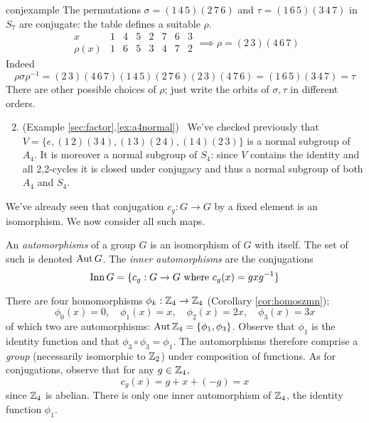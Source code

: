 \goodbreak

\begin{examples}{}{conjexample}
	\exstart The permutations $\sigma=(1\,4\,5)(2\,7\,6)$ and $\tau=(1\,6\,5)(3\,4\,7)$ in $S_7$ are conjugate: the table defines a suitable $\rho$.
	\[
		\begin{array}{l|ccccccc}
      x&1&4&5&2&7&6&3\\\hline
      \rho(x)&1&6&5&3&4&7&2
    \end{array}
    \implies \rho=(2\,3)(4\,6\,7)
   \]
	Indeed
	\[
		\rho\sigma\rho^{-1}
		=(2\,3)(4\,6\,7)(1\,4\,5)(2\,7\,6)(2\,3)(4\,7\,6)
		=(1\,6\,5)(3\,4\,7) =\tau
	\]
	There are other possible choices of $\rho$; just write the orbits of $\sigma,\tau$ in different orders.
	\begin{enumerate}\setcounter{enumi}{1}
		\item (Example \ref*{sec:factor}.\ref{ex:a4normal}) \ We've checked previously that $V=\{e,(1\,2)(3\,4),(1\,3)(2\,4),(1\,4)(2\,3)\}$ is a normal subgroup of $A_4$. It is moreover a normal subgroup of $S_4$: since $V$ contains the identity and all 2,2-cycles it is closed under conjugacy and thus a normal subgroup of both $A_4$ and $S_4$.
	\end{enumerate}
\end{examples}




We've already seen that conjugation $c_g:G\to G$ by a fixed element is an isomorphism. We now consider all such maps.

\begin{defn}{}{}
	An \emph{automorphisms} of a group $G$ is an isomorphism of $G$ with itself. The set of such is denoted $\operatorname{Aut} G$. The \emph{inner automorphisms} are the conjugations
	\[
		\operatorname{Inn} G=\{c_g:G\to G\text{ where }c_g(x)=gx g^{-1}\}
	\]
\end{defn}

\begin{example}{}{}
	There are four homomorphisms $\phi_k:\mathbb{Z}_4\to\mathbb{Z}_4$ (Corollary \ref{cor:homoszmn});
	\[
		\phi_0(x)=0,\quad 
		\phi_1(x)=x,\quad 
		\phi_2(x)=2x,\quad 
		\phi_3(x)=3x
	\]
	of which two are automorphisms: $\operatorname{Aut}\mathbb{Z}_4=\{\phi_1,\phi_3\}$.
	Observe that $\phi_1$ is the identity function and that $\phi_3\circ\phi_3=\phi_1$. The automorphisms therefore comprise a \emph{group} (necessarily isomorphic to $\mathbb{Z}_2$) under composition of functions.\smallbreak
	As for conjugations, observe that for any $g\in\mathbb{Z}_4$,
	\[
		c_g(x)=g+x+(-g)=x
	\]
	since $\mathbb{Z}_4$ is abelian. There is only one inner automorphism of $\mathbb{Z}_4$, the identity function $\phi_1$.
\end{example}

